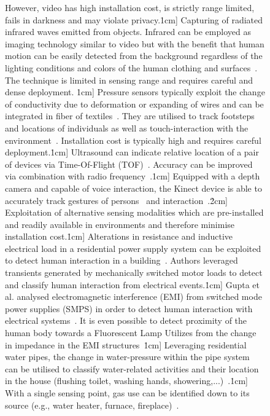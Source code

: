 \documentclass[journal]{IEEEtran}
\begin{document}
\begin{figure*}
{\begin{minipage}{.303\textwidth}
\begin{scriptsize}
\begin{sf}
\begin{spacing}{0.9}
      However, video has high installation cost, is strictly range limited, fails in darkness and may violate privacy.\.1cm]
      Capturing of radiated infrared waves emitted from objects. 
      Infrared can be employed as imaging technology similar to video but with the benefit that human motion can be easily detected from the background regardless of the lighting conditions and colors of the human clothing and surfaces~\cite{Pervasive_Han_2005,5836}.
      The technique is limited in sensing range and requires careful and dense deployment. \.1cm]
	Pressure sensors typically exploit the change of conductivity due to deformation or expanding of wires and can be integrated in fiber of textiles~\cite{Pervasive_Enokibori_2013,5840}. 
	They are utilised to track footsteps and locations of individuals as well as touch-interaction with the environment~\cite{LocationTracking_Robert_2000}. 
	Installation cost is typically high and requires careful deployment.\.1cm]
	Ultrasound can indicate relative location of a pair of devices via Time-Of-Flight (TOF)~\cite{5077}.
	Accuracy can be improved via combination with radio frequency~\cite{LocationTracking_Priyantha_2000}.\.1cm]
	Equipped with a depth camera and capable of voice interaction, the Kinect device is able to accurately track gestures of persons~\cite{Pervasive_Ren_2011,Pervasive_Panger_2012} and interaction~\cite{Pervasive_Motta_2013}.\.2cm]
      Exploitation of alternative sensing modalities which are pre-installed and readily available in environments and therefore minimise installation cost.\.1cm]
	  Alterations in resistance and inductive electrical load in a residential power supply system can be exploited to detect human interaction in a building~\cite{Pervasive_Patel_2007}.
	  Authors leveraged transients generated by mechanically switched motor loads to detect and classify human interaction from electrical events.\.1cm]
	  Gupta et al. analysed electromagnetic interference (EMI) from switched mode power supplies (SMPS) in order to detect human interaction with electrical systems~\cite{RFSensing_Gupta_2010}.
	It is even possible to detect proximity of the human body towards a Fluorescent Lamp Utilizes from the change in impedance in the EMI structures~\cite{Pervasive_Gupta_2011}\.1cm]
	  Leveraging residential water pipes, the change in water-pressure within the pipe system can be utilised to classify water-related activities and their location in the house (flushing toilet, washing hands, showering,...)~\cite{Pervasive_Campbell_2010,Pervasive_Thomaz_2012,Pervasive_Froehlich_2009}.\.1cm]
	With a single sensing point, gas use can be identified down to its source (e.g., water heater, furnace, fireplace)~\cite{Pervasive_Cohn_2010b}.

\end{spacing}
\end{sf}
\end{scriptsize}
\end{minipage}}
\end{figure*}
\end{document}
